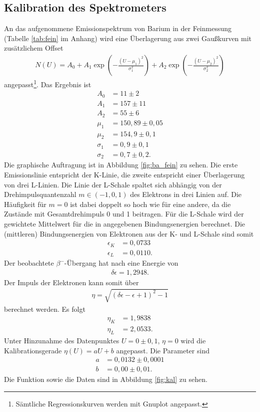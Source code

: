 \subsection{Kalibration des Spektrometers}
An das aufgenommene Emissionspektrum von Barium in der Feinmessung (Tabelle \ref{tab:fein} im Anhang) wird eine Überlagerung aus zwei Gaußkurven mit zusätzlichem Offset
\begin{align}
  N(U)=A_0+A_1\exp \left(-\frac{(U-\mu_1)^2}{\sigma_1^2}\right) +A_2\exp\left(-\frac{(U-\mu_2)^2}{\sigma_2^2} \right)
\label{eq:gauss}
\end{align}
angepasst\footnote{Sämtliche Regressionskurven werden mit Gnuplot angepasst.}. Das Ergebnis ist
\begin{align*}
  A_0&=11\pm 2\\
  A_1&=157\pm 11\\
  A_2&=55\pm 6\\
  \mu_1&=150,89 \pm 0,05\\
  \mu_2&=154,9 \pm 0,1\\
  \sigma_1&=0,9 \pm 0,1\\
  \sigma_2&=0,7 \pm 0,2.
\end{align*}
Die graphische Auftragung ist in Abbildung \ref{fig:ba_fein} zu sehen.
Die erste Emissionslinie entspricht der K-Linie, die zweite entspricht einer Überlagerung von drei L-Linien. Die Linie der L-Schale spaltet sich abhängig von der Drehimpulsquantenzahl $m \in (-1,0,1)$ des Elektrons in drei Linien auf. Die Häufigkeit für $m=0$ ist dabei doppelt so hoch wie für eine andere, da die Zustände mit Gesamtdrehimpuls 0 und 1 beitragen. Für die L-Schale wird der gewichtete Mittelwert für die in \cite{praktikumsheft} angegebenen Bindungsenergien berechnet. Die (mittleren) Bindungsenergien von Elektronen aus der K- und L-Schale sind somit 
\begin{align*}
  \epsilon_K&=0,0733\\
  \epsilon_L&=0,0110.
\end{align*} 
Der beobachtete $\beta^-$-Übergang hat nach \cite{praktikumsheft} eine Energie von
\begin{align*}
  \delta\epsilon=1,2948.
\end{align*}
Der Impuls der Elektronen kann somit über 
\begin{align*}
  \eta=\sqrt{(\delta\epsilon-\epsilon+1)^2-1}
\end{align*}
 berechnet werden. Es folgt
\begin{align*}
  \eta_K&=1,9838\\
  \eta_L&=2,0533.
\end{align*}
Unter Hinzunahme des Datenpunktes $U=0 \pm 0,1$, $\eta=0$ wird die Kalibrationsgerade $\eta(U)=aU+b$ angepasst. Die Parameter sind
\begin{align*}
  a&=0,0132 \pm 0,0001\\
  b&=0,00 \pm 0,01.
\end{align*}
Die Funktion sowie die Daten sind in Abbildung \ref{fig:kal} zu sehen.

